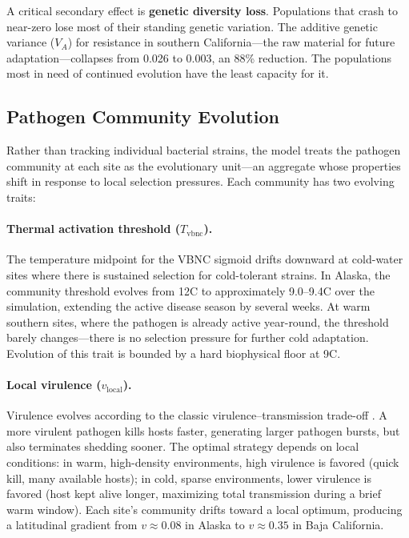 A critical secondary effect is \textbf{genetic diversity loss}.  Populations
that crash to near-zero lose most of their standing genetic variation.
The additive genetic variance ($V_A$) for resistance in southern
California---the raw material for future adaptation---collapses from
0.026 to 0.003, an 88\% reduction.  The populations most in need of
continued evolution have the least capacity for it.

\subsection{Pathogen Community Evolution}
\label{sec:pathogen_evo_model}

Rather than tracking individual bacterial strains, the model treats the
pathogen community at each site as the evolutionary unit---an aggregate
whose properties shift in response to local selection pressures.  Each
community has two evolving traits:

\paragraph{Thermal activation threshold ($T_\mathrm{vbnc}$).}
The temperature midpoint for the VBNC sigmoid drifts downward at cold-water
sites where there is sustained selection for cold-tolerant strains.  In
Alaska, the community threshold evolves from 12\textdegree C to approximately
9.0--9.4\textdegree C over the simulation, extending the active disease
season by several weeks.  At warm southern sites, where the pathogen is
already active year-round, the threshold barely changes---there is no
selection pressure for further cold adaptation.  Evolution of this trait is
bounded by a hard biophysical floor at 9\textdegree C.

\paragraph{Local virulence ($v_\mathrm{local}$).}
Virulence evolves according to the classic virulence--transmission trade-off
\citep{anderson1982}.  A more virulent pathogen kills hosts faster,
generating larger pathogen bursts, but also terminates shedding sooner.  The
optimal strategy depends on local conditions: in warm, high-density
environments, high virulence is favored (quick kill, many available hosts);
in cold, sparse environments, lower virulence is favored (host kept alive
longer, maximizing total transmission during a brief warm window).  Each
site's community drifts toward a local optimum, producing a latitudinal
gradient from $v \approx 0.08$ in Alaska to $v \approx 0.35$ in Baja
California.


